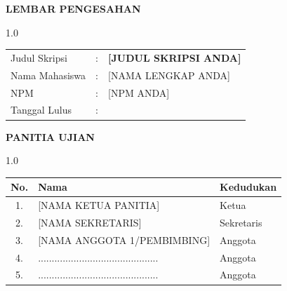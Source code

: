 \begin{center}
	{\fontsize{14}{17}\selectfont\bfseries\MakeUppercase{Lembar Pengesahan}\par}
	\vspace{1cm}
\end{center}

\thispagestyle{plain}

\begin{spacing}{1.0}
	\begin{tabular}{p{3.5cm} cp{10cm}}
		Judul Skripsi  & : & \textbf{[JUDUL SKRIPSI ANDA]} \\
		Nama Mahasiswa & : & [NAMA LENGKAP ANDA]                                                                                                                           \\
		NPM            & : & [NPM ANDA]                                                                                                                                   \\
		Tanggal Lulus  & : &                                                                                                                                            \\
	\end{tabular}
\end{spacing}

\begin{center}
	\textbf{PANITIA UJIAN}
\end{center}

\begin{spacing}{1.0}
	\begin{center}
		\begin{tabular}{|c|p{7cm}|l|}
			\hline
			\textbf{No.} & \textbf{Nama}                                       & \textbf{Kedudukan} \\
			\hline
			1.           & [NAMA KETUA PANITIA]                    & Ketua              \\
			\hline
			2.           & [NAMA SEKRETARIS]                            & Sekretaris         \\
			\hline
			3.           & [NAMA ANGGOTA 1/PEMBIMBING] & Anggota            \\
			\hline
			4.           & ............................................        & Anggota            \\
			\hline
			5.           & ............................................        & Anggota            \\
			\hline
		\end{tabular}
	\end{center}
\end{spacing}

